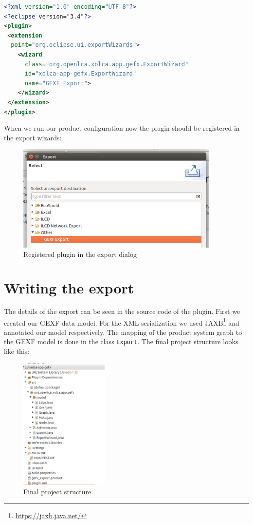 \documentclass{scrreprt}
\begin{document}
\begin{lstlisting}[language=xml]
<?xml version="1.0" encoding="UTF-8"?>
<?eclipse version="3.4"?>
<plugin>
 <extension
  point="org.eclipse.ui.exportWizards">
    <wizard
      class="org.openlca.xolca.app.gefx.ExportWizard"
      id="xolca-app-gefx.ExportWizard"
      name="GEXF Export">
    </wizard>
 </extension>
</plugin>
\end{lstlisting}

When we run our product configuration now the plugin should be registered in the export wizards:

\begin{figure}[H]
\centering
\includegraphics[width=0.9\textwidth]{images/plugin_registered.png}
\caption{Registered plugin in the export dialog}
\end{figure}  

\section{Writing the export}
The details of the export can be seen in the source code of the plugin. First we created our GEXF data model. For the XML serialization we used JAXB\footnote{\url{https://jaxb.java.net/}} and annotated our model respectively. The mapping of the product system graph to the GEXF model is done in the class \texttt{Export}. The final project structure looks like this:

\begin{figure}[H]
\centering
\includegraphics[height=250px]{images/plugin_final_structure.png}
\caption{Final project structure}
\end{figure}  
\end{document}

